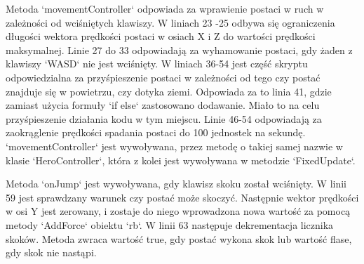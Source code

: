 \documentclass[12pt,twoside]{article}
\begin{document}
Metoda `movementController` odpowiada za wprawienie postaci w ruch w zależności
od wciśniętych klawiszy. W liniach 23 -25 odbywa się ograniczenia długości
wektora prędkości postaci w osiach X i Z do wartości prędkości maksymalnej.
Linie 27 do 33 odpowiadają za wyhamowanie postaci, gdy żaden z klawiszy `WASD`
nie jest wciśnięty. W liniach 36-54 jest część skryptu odpowiedzialna za
przyśpieszenie postaci w zależności od tego czy postać znajduje się w powietrzu,
czy dotyka ziemi. Odpowiada za to linia 41, gdzie zamiast użycia formuły `if
else` zastosowano dodawanie. Miało to na celu przyśpieszenie działania kodu w
tym miejscu. Linie 46-54 odpowiadają za zaokrąglenie prędkości spadania postaci
do 100 jednostek na sekundę. `movementController` jest wywoływana, przez metodę
o takiej samej nazwie w klasie `HeroController`, która z kolei jest wywoływana w
metodzie `FixedUpdate`. 

Metoda `onJump` jest wywoływana, gdy klawisz skoku został wciśnięty. W linii 59
jest sprawdzany warunek czy postać może skoczyć. Następnie wektor prędkości w
osi Y jest zerowany, i zostaje do niego wprowadzona nowa wartość za pomocą
metody `AddForce` obiektu `rb`. W linii 63 następuje dekrementacja licznika
skoków. Metoda zwraca wartość true, gdy postać wykona skok lub wartość flase,
gdy skok nie nastąpi. 
\end{document}
